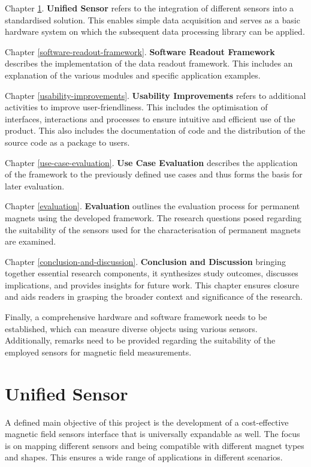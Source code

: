 Chapter \ref{unified-sensor}. \textbf{Unified Sensor} refers to the
integration of different sensors into a standardised solution. This
enables simple data acquisition and serves as a basic hardware system on
which the subsequent data processing library can be applied.

Chapter \ref{software-readout-framework}. \textbf{Software Readout
Framework} describes the implementation of the data readout framework.
This includes an explanation of the various modules and specific
application examples.

Chapter \ref{usability-improvements}. \textbf{Usability Improvements}
refers to additional activities to improve user-friendliness. This
includes the optimisation of interfaces, interactions and processes to
ensure intuitive and efficient use of the product. This also includes
the documentation of code and the distribution of the source code as a
package to users.

Chapter \ref{use-case-evaluation}. \textbf{Use Case Evaluation}
describes the application of the framework to the previously defined use
cases and thus forms the basis for later evaluation.

Chapter \ref{evaluation}. \textbf{Evaluation} outlines the evaluation
process for permanent magnets using the developed framework. The
research questions posed regarding the suitability of the sensors used
for the characterisation of permanent magnets are examined.

Chapter \ref{conclusion-and-discussion}. \textbf{Conclusion and
Discussion} bringing together essential research components, it
synthesizes study outcomes, discusses implications, and provides
insights for future work. This chapter ensures closure and aids readers
in grasping the broader context and significance of the research.

Finally, a comprehensive hardware and software framework needs to be
established, which can measure diverse objects using various sensors.
Additionally, remarks need to be provided regarding the suitability of
the employed sensors for magnetic field measurements.

\hypertarget{unified-sensor}{%
\chapter{Unified Sensor}\label{unified-sensor}}

A defined main objective of this project is the development of a
cost-effective magnetic field sensors interface that is universally
expandable as well. The focus is on mapping different sensors and being
compatible with different magnet types and shapes. This ensures a wide
range of applications in different scenarios.

